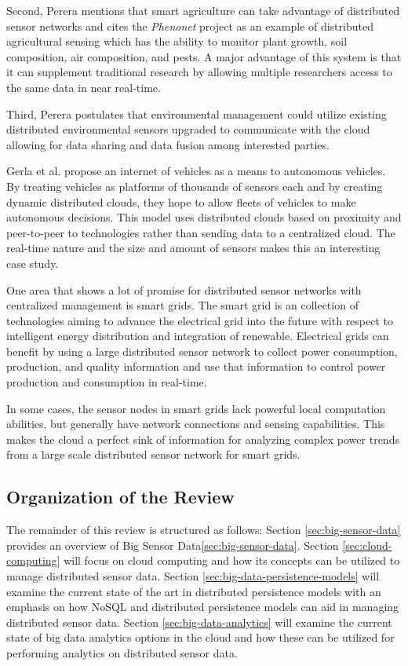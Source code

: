 \documentclass[]{article}
\begin{document}
Second, Perera mentions that smart agriculture can take advantage of distributed sensor networks and cites the  \textit{Phenonet} project as an example of distributed agricultural sensing which has the ability to monitor plant growth, soil composition, air composition, and pests. A major advantage of this system is that it can supplement traditional research by allowing multiple researchers access to the same data in near real-time.

Third, Perera postulates that environmental management could utilize existing distributed environmental sensors upgraded to communicate with the cloud allowing for data sharing and data fusion among interested parties.

Gerla et al.\cite{gerla_internet_2014} propose an internet of vehicles as a means to autonomous vehicles. By treating vehicles as platforms of thousands of sensors each and by creating dynamic distributed clouds, they hope to allow fleets of vehicles to make autonomous decisions. This model uses distributed clouds based on proximity and peer-to-peer to technologies rather than sending data to a centralized cloud. The real-time nature and the size and amount of sensors makes this an interesting case study.

One area that shows a lot of promise for distributed sensor networks with centralized management is smart grids. The smart grid is an collection of technologies aiming to advance the electrical grid into the future with respect to intelligent energy distribution and integration of renewable. Electrical grids can benefit by using a large distributed sensor network to collect power consumption, production, and quality information and use that information to control power production and consumption in real-time. 

In some cases, the sensor nodes in smart grids lack powerful local computation abilities, but generally have network connections and sensing capabilities. This makes the cloud a perfect sink of information for analyzing complex power trends from a large scale distributed sensor network for smart grids\cite{botta_integration_2016}.

\subsection{Organization of the Review} \label{ssec:rest-of-this-review}
The remainder of this review is structured as follows: Section \ref{sec:big-sensor-data} provides an overview of Big Sensor Data\ref{sec:big-sensor-data}. Section \ref{sec:cloud-computing} will focus on cloud computing and how its concepts can be utilized to manage distributed sensor data. Section \ref{sec:big-data-persistence-models} will examine the current state of the art in distributed persistence models with an emphasis on how NoSQL and distributed persistence models can aid in managing distributed sensor data. Section \ref{sec:big-data-analytics} will examine the current state of big data analytics options in the cloud and how these can be utilized for performing analytics on distributed sensor data.
\end{document}
